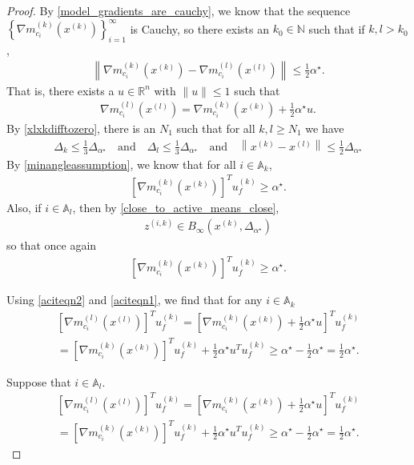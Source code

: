 \documentclass{article}
\theoremstyle{case}
\numberwithin{theorem}{subsection}
\newcommand{\activeconstraintsk}{{\mathbb A_{k}}}
\newcommand{\activeconstraintsl}{{\mathbb A_{l}}}
\newcommand{\dk}{\Delta_k}
\newcommand{\dl}{\Delta_l}
\newcommand{\gmcik}{{\nabla m_{c_i}^{(k)}\left(\xk\right)}}
\newcommand{\gmcil}{{\nabla m_{c_i}^{(l)}\left(\xl\right)}}
\newcommand{\mcik}{{{m}^{(k)}_{c_i}}}
\newcommand{\mcil}{{{m}^{(l)}_{c_i}}}
\newcommand{\minanglealpha}{{ \alpha^{\star} }}
\newcommand{\minangledelta}{{\Delta_{\alpha^{\star}}}}
\newcommand{\naturals}{\mathbb N}
\newcommand{\Rn}{\mathbb R^n}
\newcommand{\xk}{{x^{(k)}}}
\newcommand{\xl}{{x^{(l)}}}
\newcommand{\zik}{{z^{(i, k)}}}
\newcommand{\minangledirk}{{u^{(k)}_f}}
\begin{document}
\begin{proof}
By \cref{model_gradients_are_cauchy}, we know that the sequence $\left\{\gmcik\right\}_{i=1}^{\infty}$ is Cauchy,
so there exists an $k_0 \in \naturals$ such that if $k, l > k_0$,
\begin{align*}
\left\|\nabla \mcik\left(\xk\right) - \nabla \mcil\left(\xl\right) \right\| \le \frac 1 2 \minanglealpha.
\end{align*}
That is, there exists a $u \in \Rn$ with $\|u\| \le 1$ such that 
\begin{align}
\gmcil = \gmcik + \frac 1 2 \minanglealpha u. \label{aciteqn1}
\end{align}
By \cref{xlxkdifftozero}, there is an $N_1$ such that for all $k, l \ge N_1$ we have 
\begin{align}
\dk \le \frac 1 3 \minangledelta 
\quad \textrm{and} \quad
\dl \le \frac 1 3 \minangledelta 
\quad \textrm{and} \quad
\left\|\xk - \xl\right\| \le \frac 1 2 \minangledelta
\end{align}
By \cref{minangleassumption}, we know that for all $i \in \activeconstraintsk$,
\begin{align}
\left[\gmcik\right]^T \minangledirk \ge \minanglealpha.  \label{aciteqn2}
\end{align}
Also, if $i \in \activeconstraintsl$, then by \cref{close_to_active_means_close}, 
\begin{align*}
\zik \in B_{\infty}\left(\xk, \minangledelta\right)
\end{align*}
so that once again
\begin{align}
\left[\gmcik\right]^T \minangledirk \ge \minanglealpha.
\end{align}

Using \cref{aciteqn2} and \cref{aciteqn1}, we find that for any $i \in \activeconstraintsk$
\begin{align*}
\left[\gmcil \right]^T \minangledirk = \left[\gmcik + \frac 1 2 \minanglealpha u \right]^T \minangledirk \\
= \left[\gmcik\right]^T \minangledirk + \frac 1 2 \minanglealpha u^T \minangledirk
\ge \minanglealpha - \frac 1 2 \minanglealpha = \frac 1 2 \minanglealpha.
\end{align*}


Suppose that $i \in \activeconstraintsl$.
\begin{align*}
\left[\gmcil \right]^T \minangledirk = \left[\gmcik + \frac 1 2 \minanglealpha u \right]^T \minangledirk \\
= \left[\gmcik\right]^T \minangledirk + \frac 1 2 \minanglealpha u^T \minangledirk
\ge \minanglealpha - \frac 1 2 \minanglealpha = \frac 1 2 \minanglealpha.
\end{align*}




\end{proof}
\end{document}
